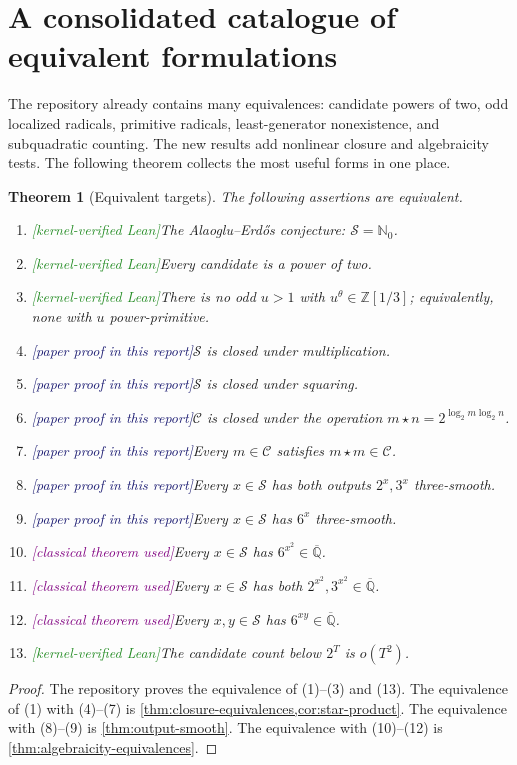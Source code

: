\documentclass[11pt,oneside]{article}
\newtheorem{theorem}{Theorem}[section]
\theoremstyle{definition}
\newcommand{\Nzero}{\mathbb N_0}
\newcommand{\Z}{\mathbb Z}
\newcommand{\Qbar}{\overline{\mathbb Q}}
\newcommand{\Sol}{\mathcal S}
\newcommand{\Cand}{\mathcal C}
\newcommand{\tagLean}{\textcolor{ForestGreen}{\textsf{[kernel-verified Lean]}}}
\newcommand{\tagPaper}{\textcolor{MidnightBlue}{\textsf{[paper proof in this report]}}}
\newcommand{\tagClassical}{\textcolor{Purple}{\textsf{[classical theorem used]}}}
\begin{document}
\section{A consolidated catalogue of equivalent formulations}\label{sec:equivalences}

The repository already contains many equivalences: candidate powers of two, odd localized
radicals, primitive radicals, least-generator nonexistence, and subquadratic counting.  The
new results add nonlinear closure and algebraicity tests.  The following theorem collects
the most useful forms in one place.

\begin{theorem}[Equivalent targets]\label{thm:equivalent-targets}
The following assertions are equivalent.
\begin{enumerate}[label=\textup{(\arabic*)}]
\item \tagLean The Alaoglu--Erd\H{o}s conjecture: \(\Sol=\Nzero\).
\item \tagLean Every candidate is a power of two.
\item \tagLean There is no odd \(u>1\) with \(u^\theta\in\Z[1/3]\); equivalently, none
with \(u\) power-primitive.
\item \tagPaper \(\Sol\) is closed under multiplication.
\item \tagPaper \(\Sol\) is closed under squaring.
\item \tagPaper \(\Cand\) is closed under the operation
\(m\star n=2^{\log_2m\log_2n}\).
\item \tagPaper Every \(m\in\Cand\) satisfies \(m\star m\in\Cand\).
\item \tagPaper Every \(x\in\Sol\) has both outputs \(2^x,3^x\) three-smooth.
\item \tagPaper Every \(x\in\Sol\) has \(6^x\) three-smooth.
\item \tagClassical Every \(x\in\Sol\) has \(6^{x^2}\in\Qbar\).
\item \tagClassical Every \(x\in\Sol\) has both \(2^{x^2},3^{x^2}\in\Qbar\).
\item \tagClassical Every \(x,y\in\Sol\) has \(6^{xy}\in\Qbar\).
\item \tagLean The candidate count below \(2^T\) is \(o(T^2)\).
\end{enumerate}
\end{theorem}

\begin{proof}
The repository proves the equivalence of (1)--(3) and (13).  The equivalence of (1) with
(4)--(7) is \cref{thm:closure-equivalences,cor:star-product}.  The equivalence with
(8)--(9) is \cref{thm:output-smooth}.  The equivalence with (10)--(12) is
\cref{thm:algebraicity-equivalences}.
\end{proof}
\end{document}
